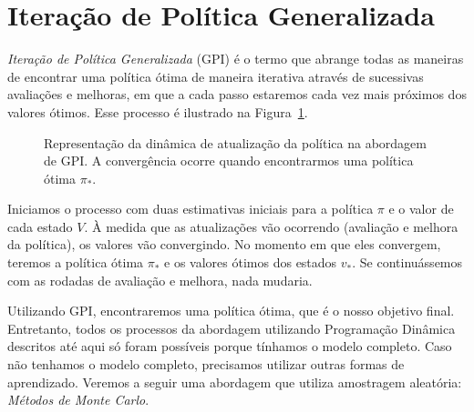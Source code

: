 \documentclass{article}
\begin{document}
    \section{Iteração de Política Generalizada}
    
        \emph{Iteração de Política Generalizada} (GPI) é o termo que abrange todas as maneiras de encontrar uma política ótima de maneira iterativa através de sucessivas avaliações e melhoras, em que a cada passo estaremos cada vez mais próximos dos valores ótimos. Esse processo é ilustrado na Figura~\ref{diag:generalized-policy-iteration}. 
        
        \vspace{5mm}
        \begin{figure}[ht]
            \centering
            \caption{Representação da dinâmica de atualização da política na abordagem de GPI. A convergência ocorre quando encontrarmos uma política ótima $\pi_*$.}
            \label{diag:generalized-policy-iteration}
        \end{figure}
        
        Iniciamos o processo com duas estimativas iniciais para a política $\pi$ e o valor de cada estado $V$. À medida que as atualizações vão ocorrendo (avaliação e melhora da política), os valores vão convergindo. No momento em que eles convergem, teremos a política ótima $\pi_*$ e os valores ótimos dos estados $v_*$. Se continuássemos com as rodadas de avaliação e melhora, nada mudaria.
        
        Utilizando GPI, encontraremos uma política ótima, que é o nosso objetivo final. Entretanto, todos os processos da abordagem utilizando Programação Dinâmica descritos até aqui só foram possíveis porque tínhamos o modelo completo. Caso não tenhamos o modelo completo, precisamos utilizar outras formas de aprendizado. Veremos a seguir uma abordagem que utiliza amostragem aleatória: \emph{Métodos de Monte Carlo}.
        
\end{document}
